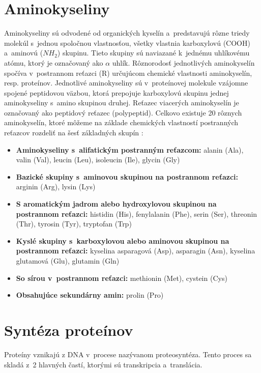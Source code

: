 \section{Aminokyseliny}
Aminokyseliny sú odvodené od organických kyselín a~predstavujú rôzne triedy molekúl s~jednou spoločnou vlastnosťou, všetky vlastnia karboxylovú (COOH) a~aminovú ($NH_{2}$) skupinu. Tieto skupiny sú naviazané k~jednému uhlíkovému atómu, ktorý je označovaný ako $\alpha$ uhlík. Rôznorodosť jednotlivých aminokyselín spočíva v~postrannom reťazci (R) určujúcom chemické vlastnosti aminokyselín, resp. proteínov. Jednotlivé aminokyseliny sú v~proteínovej molekule vzájomne spojené peptidovou väzbou, ktorá prepojuje karboxylovú skupinu jednej aminokyseliny s~amino skupinou druhej. Reťazec viacerých aminokyselín je označovaný ako peptidový reťazec (polypeptid). 
Celkovo existuje 20 rôznych aminokyselín, ktoré môžeme na základe chemických vlastností postranných reťazcov rozdeliť na šesť základných skupín \cite{aminokyseliny}:

\begin{itemize}
	\item \textbf{Aminokyseliny s~alifatickým postranným reťazcom:} alanin (Ala), valin (Val), leucin (Leu), isoleucin (Ile), glycin (Gly)
	\item \textbf{Bazické skupiny s~aminovou skupinou na postrannom reťazci:} arginin (Arg), lysin (Lys)
	\item \textbf{S aromatickým jadrom alebo hydroxylovou skupinou na postrannom reťazci:}
	histidin (His), fenylalanin (Phe), serin (Ser), threonin (Thr), tyrosin (Tyr), tryptofan (Trp)
	\item \textbf{Kyslé skupiny s~karboxylovou alebo aminovou skupinou na postrannom reťazci:} kyselina asparagová (Asp), asparagin (Asn), kyselina glutamová (Glu), glutamin (Gln)
	\item \textbf{So sírou v~postrannom reťazci:} methionin (Met), cystein (Cys)
	\item \textbf{Obsahujúce sekundárny amin:} prolin (Pro)
\end{itemize}

\section{Syntéza proteínov}

Proteíny vznikajú z DNA v~procese nazývanom proteosyntéza. Tento proces sa skladá z~2 hlavných častí, ktorými sú transkripcia a~translácia.

